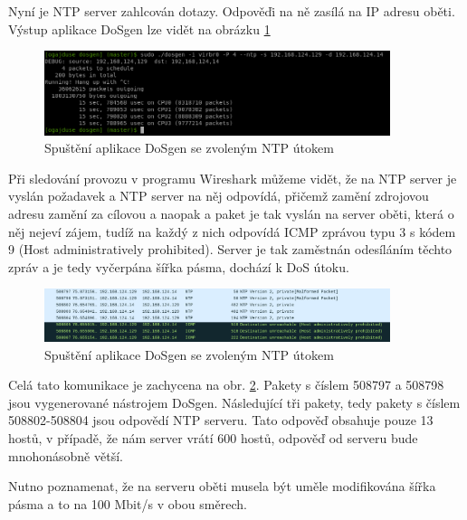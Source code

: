 Nyní je NTP server zahlcován dotazy. Odpověďi na ně zasílá na IP adresu oběti. Výstup aplikace DoSgen lze vidět na obrázku \ref{fig:dosgen_run_ntp-img}

\begin{figure} [h]
	\centering
	\includegraphics[width=0.9\textwidth]{obrazky/dosgen_terminal_run_ntp.png} %
	\caption{Spuštění aplikace DoSgen se zvoleným NTP útokem}
	\label{fig:dosgen_run_ntp-img}
\end{figure}

Při sledování provozu v programu Wireshark můžeme vidět, že na NTP server je vyslán požadavek  a NTP server na něj odpovídá, přičemž zamění zdrojovou adresu zamění za cílovou a naopak a paket je tak vyslán na server oběti, která o něj nejeví zájem, tudíž na každý z nich odpovídá ICMP zprávou typu 3 s kódem 9 (Host administratively prohibited). Server je tak zaměstnán odesíláním těchto zpráv a je tedy vyčerpána šířka pásma, dochází k DoS útoku.

\begin{figure} [h]
	\centering
	\includegraphics[width=0.9\textwidth]
	{obrazky/mon_getlist_1_wireshark_with_icmp_and_reply.png}
	\caption{Spuštění aplikace DoSgen se zvoleným NTP útokem}
	\label{fig:mon_getlist_1_wireshark_with_icmp_and_reply-img}
\end{figure}

Celá tato komunikace je zachycena na obr. \ref{fig:mon_getlist_1_wireshark_with_icmp_and_reply-img}. Pakety s číslem 508797 a 508798 jsou vygenerované nástrojem DoSgen. Následující tři pakety, tedy pakety s číslem 508802-508804 jsou odpovědí NTP serveru. Tato odpověď obsahuje pouze 13 hostů, v případě, že nám server vrátí 600 hostů, odpověď od serveru bude mnohonásobně větší.

Nutno poznamenat, že na serveru oběti musela být uměle modifikována šířka pásma a to na 100 Mbit/s v obou směrech.







